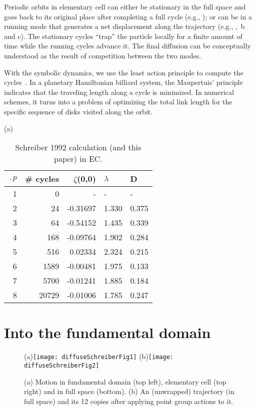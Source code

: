 \documentclass[aps,pre,
                showpacs,
                twocolumn,
                groupedaddress,
                floatfix]{revtex4-1}
\begin{document}
Periodic orbits in elementary cell can either be stationary in the full space
and goes back to its original place after completing a full cycle (e.g.,
); or can be in a running mode that generates a net displacement along
the trajectory (e.g., , \,b and c).
The stationary cycles ``trap'' the  particle locally for a finite amount of time
while the running cycles advance it. The final diffusion 
can be conceptually understood as the result of competition between the two 
modes.

With the symbolic dynamics, we use the least action principle to compute the 
cycles~. In a planetary Hamiltonian billiard system, the 
Maupertuis' principle indicates that the traveling length along a cycle is 
minimized. In numerical schemes, it turns into a problem of optimizing the 
total link length for the specific sequence of disks visited along the orbit. 


\begin{table}[htbp]
(a)\\
\begin{tabular}{|r|r|r|l|l|}
\hline
$\period{p}$ & \# cycles & $\zeta$(0,0) & $\lambda$ & D \\ \hline\hline
1      & 0      &   -    &   -  &   - \\
2      & 24     & -0.31697 & 1.330 & 0.375\\
3      & 64     & -0.54152 & 1.435 & 0.339\\
4      & 168    & -0.09764 & 1.902 & 0.284\\
5      & 516    &  0.02334 & 2.324 & 0.215\\
6      & 1589   & -0.00481 & 1.975 & 0.133\\
7      & 5700   & -0.01241 & 1.885 & 0.184\\
8      & 20729  & -0.01006 & 1.785 & 0.247\\ \hline

\end{tabular}
\caption{\label{TCELL1}
Schreiber 1992 calculation (and
  this paper) in EC.
}
\end{table}

\section{Into the fundamental domain}
\label{s-SymmetryReduction}
\begin{figure}[htbp]
  \begin{center}
    (a)\texttt{[image: diffuseSchreiberFig1]}
    (b)\texttt{[image: diffuseSchreiberFig2]}
  \end{center}
  \caption[]{\label{fig-schrieberFig12} (a) Motion in fundamental domain (top 
  left), elementary cell (top right) and
  in full space (bottom). (b) An (unwrapped) trajectory (in full
  space) and its 12 copies after applying point group actions to it. 
  }
\end{figure}
\end{document}
